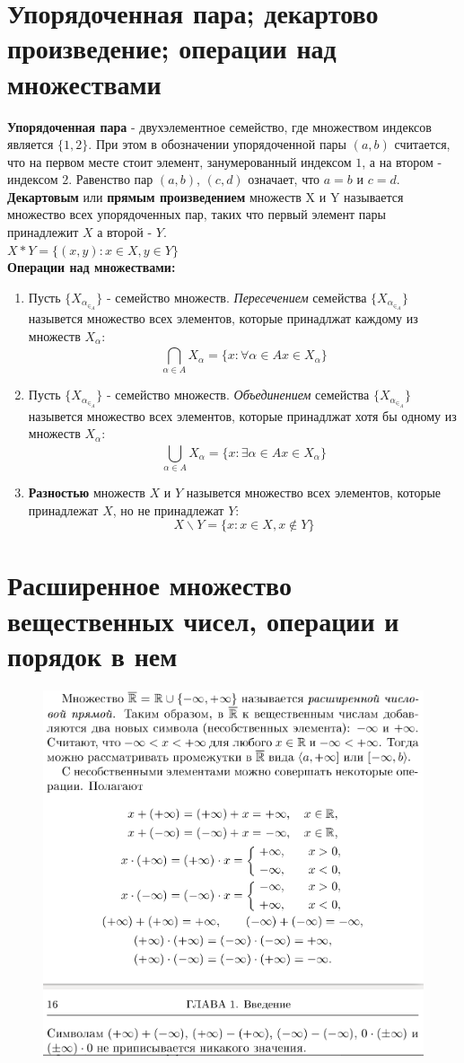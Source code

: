 \documentclass[12pt, a4paper]{article}
\begin{document}
 
\section{Упорядоченная пара; декартово произведение; операции над множествами}
	\textbf{Упорядоченная пара} - двухэлементное семейство, где множеством индексов является $\{1, 2\}$. При этом в обозначении упорядоченной пары $(a,b)$ считается, что на первом месте стоит элемент, занумерованный индексом $1$, а на втором - индексом $2$. Равенство пар $(a, b)$, $(c, d)$ означает, что $a = b$ и $c = d$.\\
	\textbf{Декартовым} или \textbf{прямым произведением} множеств X и Y называется множество всех упорядоченных пар, таких что первый элемент пары принадлежит $X$ а второй - $Y$.\\
	$X*Y = \{(x, y) : x \in X, y \in Y\}$\\
	\textbf{Операции над множествами:}
	\begin{enumerate}
		\item Пусть $\{X_\alpha _\in _A \}$ - семейство множеств. \textit{Пересечением} семейства $\{X_\alpha _\in _A\}$ назывется множество всех элементов, которые принадлжат каждому из множеств $X_\alpha$:
		$$\bigcap\limits_{\alpha \in A}^{} X_\alpha = \{x : \forall \alpha \in A x \in X_\alpha \}$$
		\item Пусть $\{X_\alpha _\in _A \}$ - семейство множеств. \textit{Объединением} семейства $\{X_\alpha _\in _A\}$ назывется множество всех элементов, которые принадлжат хотя бы одному из множеств $X_\alpha$:
		$$\bigcup\limits_{\alpha \in A}^{} X_\alpha = \{x : \exists \alpha \in A x \in X_\alpha \}$$
		\item \textbf{Разностью} множеств $X$ и $Y$ назывется множество всех элементов, которые принадлежат $X$, но не принадлежат $Y$:
		$$X \backslash Y = \{x : x \in X, x \notin Y \}$$
	\end{enumerate}
\section{Расширенное множество вещественных чисел, операции и порядок в нем}
\begin{figure}[h]
    \centering
    \includegraphics[width=0.8\linewidth]{imagesMin/2.png}
\end{figure}
\end{document}

